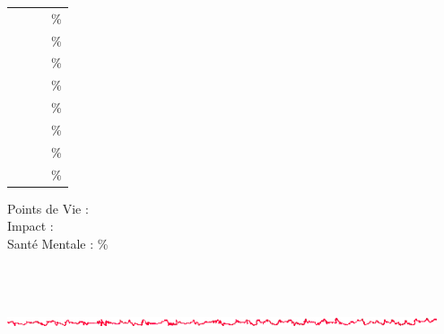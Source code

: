 \begin{minipage}[ht]{0.80\textwidth}
	\begin{minipage}[ht]{0.725\textwidth}
		\begin{tabular}[c]{ p{2.50cm} p{2.00cm} p{2.50cm} p{2.00cm} }
			\FRdefCharacterSkillsAPP	& \dotfill \CApersoAPP & \FRdefCharacterSkillsPES & \dotfill \CApersoPES \%	\\
			\FRdefCharacterSkillsCON	& \dotfill \CApersoCON & \FRdefCharacterSkillsSTA & \dotfill \CApersoSTA \%	\\
			\FRdefCharacterSkillsDEX	& \dotfill \CApersoDEX & \FRdefCharacterSkillsAGI & \dotfill \CApersoAGI \%	\\
			\FRdefCharacterSkillsPOW	& \dotfill \CApersoFOR & \FRdefCharacterSkillsPUI & \dotfill \CApersoPUI \%	\\
			\FRdefCharacterSkillsTAI	& \dotfill \CApersoTAI & \FRdefCharacterSkillsCOR & \dotfill \CApersoCOR \%	\\
			\FRdefCharacterSkillsEDU	& \dotfill \CApersoEDU & \FRdefCharacterSkillsKNO & \dotfill \CApersoKNO \%	\\
			\FRdefCharacterSkillsINT	& \dotfill \CApersoINT & \FRdefCharacterSkillsIUI & \dotfill \CApersoIUI \%	\\
			\FRdefCharacterSkillsPOU	& \dotfill \CApersoPOU & \FRdefCharacterSkillsVOL & \dotfill \CApersoVOL \%	\\
		\end{tabular}
	\end{minipage} \hfill \begin{minipage}[ht]{0.25\textwidth}
		Points de Vie : \CApersoPV ~\\
		Impact : \CApersoIMPACT ~\\
		Sant{\'e} Mentale : \CApersoSAN \% ~\\~\\ %
	\end{minipage}
	
\end{minipage} ~\\

	\begin{center}
		\includegraphics[width=0.95\textwidth]{Filet_CA.png}
	\end{center}

